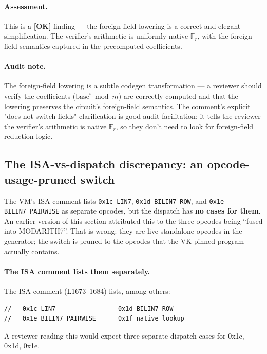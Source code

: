 \paragraph{Assessment.} This is a
\textcolor{tracegreen}{\textbf{[OK]}} finding --- the
foreign-field lowering is a correct and elegant simplification.
The verifier's arithmetic is uniformly native $\mathbb{F}_r$,
with the foreign-field semantics captured in the precomputed
coefficients.

\paragraph{Audit note.} The foreign-field lowering is a subtle
codegen transformation --- a reviewer should verify the
coefficients ($\text{base}^i \bmod m$) are correctly computed
and that the lowering preserves the circuit's foreign-field
semantics. The comment's explicit "does not switch fields"
clarification is good audit-facilitation: it tells the reviewer
the verifier's arithmetic is native $\mathbb{F}_r$, so they don't
need to look for foreign-field reduction logic.

\subsection{The ISA-vs-dispatch discrepancy: an opcode-usage-pruned switch}
\label{sec:pr-isa-dispatch}

The VM's ISA comment lists \texttt{0x1c LIN7}, \texttt{0x1d
BILIN7\_ROW}, and \texttt{0x1e BILIN7\_\allowbreak{}PAIRWISE} as separate
opcodes, but the dispatch has \textbf{no cases for them}.
 An earlier version of this section attributed
this to the three opcodes being ``fused into MODARITH7''. That is
wrong: they are live standalone opcodes in the generator; the
switch is pruned to the opcodes that the VK-pinned program
actually contains.

\paragraph{The ISA comment lists them separately.} The ISA comment
(L1673--1684) lists, among others:
\begin{lstlisting}[style=plain]
//   0x1c LIN7                 0x1d BILIN7_ROW
//   0x1e BILIN7_PAIRWISE      0x1f native lookup
\end{lstlisting}
A reviewer reading this would expect three separate dispatch
cases for 0x1c, 0x1d, 0x1e.

